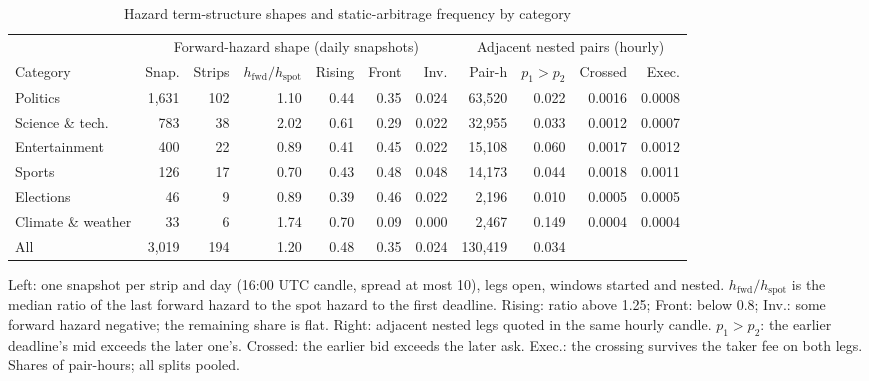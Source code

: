 \begin{table}[t]
\centering
\begin{threeparttable}
\caption{Hazard term-structure shapes and static-arbitrage frequency by category}\label{haz-tab-term}
\footnotesize
\setlength{\tabcolsep}{4pt}
\begin{tabular}{@{}lrrrrrrrrrr@{}}
\toprule
 & \multicolumn{6}{c}{Forward-hazard shape (daily snapshots)} & \multicolumn{4}{c}{Adjacent nested pairs (hourly)} \\
\cmidrule(lr){2-7}\cmidrule(l){8-11}
Category & Snap. & Strips & $h_{\mathrm{fwd}}/h_{\mathrm{spot}}$ & Rising & Front & Inv. & Pair-h & $p_1>p_2$ & Crossed & Exec. \\
\midrule
Politics          & 1{,}631 & 102 & 1.10 & 0.44 & 0.35 & 0.024 & 63{,}520 & 0.022 & 0.0016 & 0.0008 \\
Science \& tech.  &    783 &  38 & 2.02 & 0.61 & 0.29 & 0.022 & 32{,}955 & 0.033 & 0.0012 & 0.0007 \\
Entertainment     &    400 &  22 & 0.89 & 0.41 & 0.45 & 0.022 & 15{,}108 & 0.060 & 0.0017 & 0.0012 \\
Sports            &    126 &  17 & 0.70 & 0.43 & 0.48 & 0.048 & 14{,}173 & 0.044 & 0.0018 & 0.0011 \\
Elections         &     46 &   9 & 0.89 & 0.39 & 0.46 & 0.022 &  2{,}196 & 0.010 & 0.0005 & 0.0005 \\
Climate \& weather &    33 &   6 & 1.74 & 0.70 & 0.09 & 0.000 &  2{,}467 & 0.149 & 0.0004 & 0.0004 \\
\midrule
All               & 3{,}019 & 194 & 1.20 & 0.48 & 0.35 & 0.024 & 130{,}419 & 0.034 & & \\
\bottomrule
\end{tabular}
\begin{tablenotes}\footnotesize
\item Left: one snapshot per strip and day (16:00 UTC candle, spread at most 10\textcent), legs open,
windows started and nested. $h_{\mathrm{fwd}}/h_{\mathrm{spot}}$ is the median ratio of the last
forward hazard to the spot hazard to the first deadline. Rising: ratio above 1.25; Front: below 0.8;
Inv.: some forward hazard negative; the remaining share is flat. Right: adjacent nested legs quoted in
the same hourly candle. $p_1>p_2$: the earlier deadline's mid exceeds the later one's. Crossed: the
earlier bid exceeds the later ask. Exec.: the crossing survives the taker fee on both legs. Shares of
pair-hours; all splits pooled.
\end{tablenotes}
\end{threeparttable}
\end{table}

